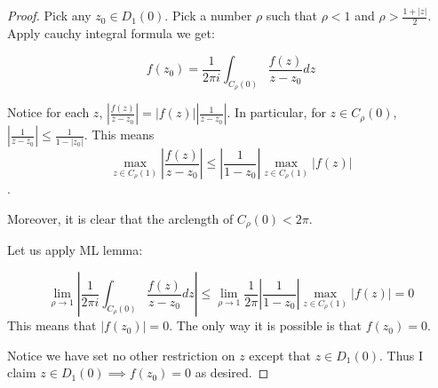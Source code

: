 \documentclass[12pt, a4paper]{article}
\theoremstyle{definition}
\theoremstyle{remark}
\begin{document}
\begin{proof}
  Pick any $z_0 \in D_1(0)$. Pick a number $\rho$ such that $ \rho < 1 $ and $\rho >  \frac{1+|z|}{2}$. Apply cauchy integral formula we get: 

  \[
    f(z_0) = \frac{1}{2\pi i} \displaystyle\int_{C_{\rho}(0)} \frac{f(z)}{z-z_0} dz 
  \]
  
  Notice for each $z$, $|\frac{f(z)}{z-z_0}| = |f(z)| |\frac{1}{z-z_0}|$. 
  In particular, for $z \in C_\rho(0)$, $|\frac{1}{z-z_0}| \leq \frac{1}{1- |z_0|} $. 
  This means 
  $$\max_{z \in C_{\rho}(1)} \left|\frac{f(z)}{z-z_0}\right| \leq  \left|\frac{1}{1- z_0}\right| \max_{z \in C_{\rho}(1)} \left|f(z)\right|$$. 

  Moreover, it is clear that the arclength of $C_{\rho} (0) < 2\pi$.

  Let us apply ML lemma: 
  
  \[
    \lim_{\rho \rightarrow  1} \left| \frac{1}{2\pi i} \displaystyle\int_{C_{\rho}(0)} \frac{f(z)}{z-z_0} dz \right| 
    \leq  \lim_{\rho \rightarrow  1} \frac{1}{2 \pi}  \left|\frac{1}{1- z_0}\right| \max_{z \in C_{\rho}(1)} \left|f(z)\right| = 0
  \]
  This means that $|f(z_0)| = 0$. The only way it is possible is that $f(z_0) =0$.

  Notice we have set no other restriction on $z$ except that $z \in D_1(0)$. Thus I claim $z\in D_1(0) \implies f(z_0) = 0 $ as desired.
 
\end{proof}



\end{document}
